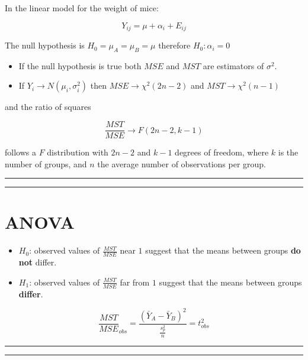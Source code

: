 \documentclass[
]{book}
\begin{document}
In the linear model for the weight of mice:

\[Y_{ij} = \mu + \alpha_i +E_{ij}\]

The null hypothesis is \(H_0=\mu_A=\mu_B=\mu\) therefore \(H_0:\alpha_i=0\)

\begin{itemize}
\item
  If the null hypothesis is true both \(MSE\) and \(MST\) are estimators of \(\sigma^2\).
\item
  If \(Y_i \rightarrow N(\mu_i, \sigma^2_i)\) then \(MSE \rightarrow \chi^2(2n-2)\) and \(MST \rightarrow \chi^2(n-1)\)
\end{itemize}

and the ratio of squares

\[\frac{MST}{MSE} \rightarrow F(2n-2, k-1)\]

follows a \(F\) distribution with \(2n-2\) and \(k-1\) degrees of freedom, where \(k\) is the number of groups, and \(n\) the average number of observations per group.

\begin{center}\rule{0.5\linewidth}{0.5pt}\end{center}

\begin{center}\rule{0.5\linewidth}{0.5pt}\end{center}

\hypertarget{anova}{%
\section{ANOVA}\label{anova}}

\begin{itemize}
\item
  \(H_0\): observed values of \(\frac{MST}{MSE}\) near \(1\) suggest that the means between groups \textbf{do not} differ.
\item
  \(H_1\): observed values of \(\frac{MST}{MSE}\) far from \(1\) suggest that the means between groups \textbf{differ}.
\end{itemize}

\[\frac{MST}{MSE}_{obs}=\frac{(\bar{Y}_{A}-\bar{Y}_{B})^2}{\frac{s^2_p}{n}}=t_{obs}^2\]

\begin{center}\rule{0.5\linewidth}{0.5pt}\end{center}

\begin{center}\rule{0.5\linewidth}{0.5pt}\end{center}
\end{document}
